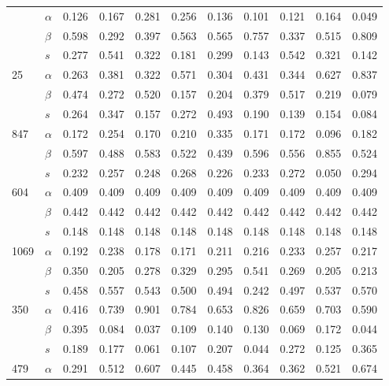 \begin{longtable}{llrrrrrrrrr}
\bottomrule
\endlastfoot
\multirow{3}{*}{558} & $\alpha$ & 0.126 & 0.167 & 0.281 & 0.256 & 0.136 & 0.101 & 0.121 & 0.164 & 0.049 \\
     & $\beta$ & 0.598 & 0.292 & 0.397 & 0.563 & 0.565 & 0.757 & 0.337 & 0.515 & 0.809 \\
     & $s$ & 0.277 & 0.541 & 0.322 & 0.181 & 0.299 & 0.143 & 0.542 & 0.321 & 0.142 \\
\cline{1-11}
\multirow{3}{*}{25} & $\alpha$ & 0.263 & 0.381 & 0.322 & 0.571 & 0.304 & 0.431 & 0.344 & 0.627 & 0.837 \\
     & $\beta$ & 0.474 & 0.272 & 0.520 & 0.157 & 0.204 & 0.379 & 0.517 & 0.219 & 0.079 \\
     & $s$ & 0.264 & 0.347 & 0.157 & 0.272 & 0.493 & 0.190 & 0.139 & 0.154 & 0.084 \\
\cline{1-11}
\multirow{3}{*}{847} & $\alpha$ & 0.172 & 0.254 & 0.170 & 0.210 & 0.335 & 0.171 & 0.172 & 0.096 & 0.182 \\
     & $\beta$ & 0.597 & 0.488 & 0.583 & 0.522 & 0.439 & 0.596 & 0.556 & 0.855 & 0.524 \\
     & $s$ & 0.232 & 0.257 & 0.248 & 0.268 & 0.226 & 0.233 & 0.272 & 0.050 & 0.294 \\
\cline{1-11}
\multirow{3}{*}{604} & $\alpha$ & 0.409 & 0.409 & 0.409 & 0.409 & 0.409 & 0.409 & 0.409 & 0.409 & 0.409 \\
     & $\beta$ & 0.442 & 0.442 & 0.442 & 0.442 & 0.442 & 0.442 & 0.442 & 0.442 & 0.442 \\
     & $s$ & 0.148 & 0.148 & 0.148 & 0.148 & 0.148 & 0.148 & 0.148 & 0.148 & 0.148 \\
\cline{1-11}
\multirow{3}{*}{1069} & $\alpha$ & 0.192 & 0.238 & 0.178 & 0.171 & 0.211 & 0.216 & 0.233 & 0.257 & 0.217 \\
     & $\beta$ & 0.350 & 0.205 & 0.278 & 0.329 & 0.295 & 0.541 & 0.269 & 0.205 & 0.213 \\
     & $s$ & 0.458 & 0.557 & 0.543 & 0.500 & 0.494 & 0.242 & 0.497 & 0.537 & 0.570 \\
\cline{1-11}
\multirow{3}{*}{350} & $\alpha$ & 0.416 & 0.739 & 0.901 & 0.784 & 0.653 & 0.826 & 0.659 & 0.703 & 0.590 \\
     & $\beta$ & 0.395 & 0.084 & 0.037 & 0.109 & 0.140 & 0.130 & 0.069 & 0.172 & 0.044 \\
     & $s$ & 0.189 & 0.177 & 0.061 & 0.107 & 0.207 & 0.044 & 0.272 & 0.125 & 0.365 \\
\cline{1-11}
\multirow{3}{*}{479} & $\alpha$ & 0.291 & 0.512 & 0.607 & 0.445 & 0.458 & 0.364 & 0.362 & 0.521 & 0.674 \\

\end{longtable}
